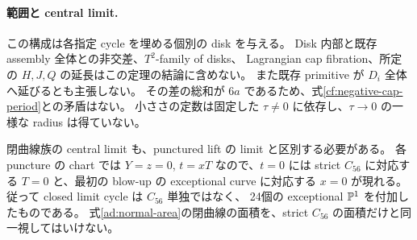 \paragraph{範囲と central limit.}
この構成は各指定 cycle を埋める個別の disk を与える。
Disk 内部と既存 assembly 全体との非交差、$T^2$-family of disks、
Lagrangian cap fibration、所定の $H,J,Q$ の延長はこの定理の結論に含めない。
また既存 primitive が $D_i$ 全体へ延びるとも主張しない。
その差の総和が $6a$ であるため、式\eqref{cf:negative-cap-period}との矛盾はない。
小ささの定数は固定した $\tau\ne0$ に依存し、$\tau\to0$ の一様な radius は得ていない。

閉曲線族の central limit も、punctured lift の limit と区別する必要がある。
各 puncture の chart では $Y=z=0$, $t=xT$ なので、$t=0$ には
strict $C_{56}$ に対応する $T=0$ と、最初の blow-up の exceptional curve に対応する $x=0$ が現れる。
従って closed limit cycle は $C_{56}$ 単独ではなく、
24個の exceptional $\mathbb P^1$ を付加したものである。
式\eqref{ad:normal-area}の閉曲線の面積を、strict $C_{56}$ の面積だけと同一視してはいけない。
